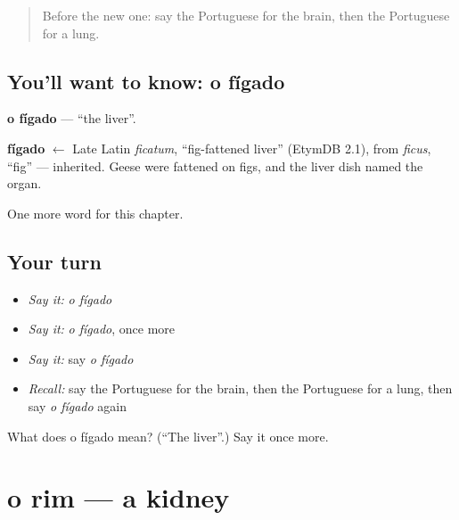 \label{lesson:PT-C148-figado}



\begin{quote}
Before the new one: say the Portuguese for the brain, then the Portuguese for a lung.
\end{quote}

\subsection*{You'll want to know: o fígado}
\textbf{o fígado} — \textquotedblleft{}the liver\textquotedblright{}.

\begin{cousinweb}
\textbf{fígado} $\leftarrow$ Late Latin \emph{ficatum}, \textquotedblleft{}fig-fattened liver\textquotedblright{} (EtymDB 2.1), from \emph{ficus}, \textquotedblleft{}fig\textquotedblright{} — inherited. Geese were fattened on figs, and the liver dish named the organ.
\end{cousinweb}

\begin{grammarlens}[title={What you've built}]
One more word for this chapter.
\end{grammarlens}

\subsection*{Your turn}
\begin{itemize}
\raggedright
  \item \emph{Say it:} \emph{o fígado}
  \item \emph{Say it:} \emph{o fígado}, once more
  \item \emph{Say it:} say \emph{o fígado}
  \item \emph{Recall:} say the Portuguese for the brain, then the Portuguese for a lung, then say \emph{o fígado} again
\end{itemize}

\begin{tcolorbox}[breakable,colback=teal!4,colframe=teal!35!black,title={Before you move on}]
What does o fígado mean? (\textquotedblleft{}The liver\textquotedblright{}.) Say it once more.
\end{tcolorbox}
\section[o rim]{o rim — a kidney}

\label{lesson:PT-C148-rim}



